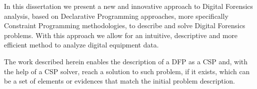 \begin{tueABSTRACT}
In this dissertation we present a new and innovative approach to Digital Forensics analysis, based on Declarative Programming approaches, more specifically Constraint Programming methodologies, to describe and solve Digital Forensics problems. With this approach we allow for an intuitive, descriptive and more efficient method to analyze digital equipment data.

The work described herein enables the description of a \acf{DFP} as a \acf{CSP} and, with the help of a \ac{CSP} solver, reach a solution to such problem, if it exists, which can be a set of elements or evidences that match the initial problem description.
\end{tueABSTRACT}
